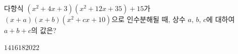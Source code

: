 다항식 $(x^2+4x+3)(x^2+12x+35)+15$가 $(x+a)(x+b)(x^2+cx+10)$으로 인수분해될 때, 상수 $a$, $b$, $c$에 대하여 $a+b+c$의 값은?
\begin{choices32}{$14$}{$16$}{$18$}{$20$}{$22$}\end{choices32}
